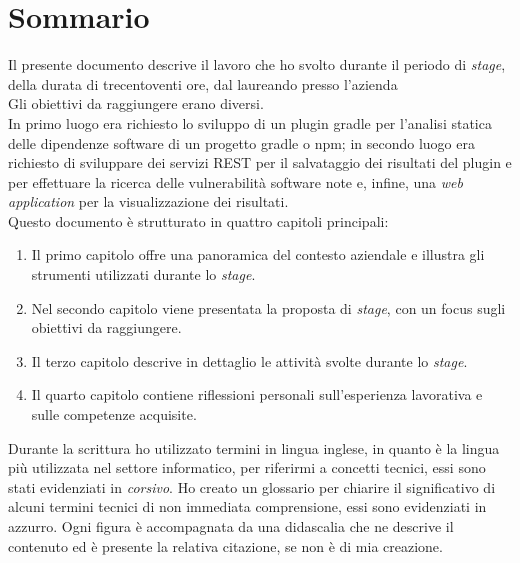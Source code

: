 \cleardoublepage
{}
{}
\begingroup
\let\clearpage\relax
\let\cleardoublepage\relax
\let\cleardoublepage\relax

\chapter*{Sommario}

Il presente documento descrive il lavoro che ho svolto durante il periodo di \textit{stage}, della durata di trecentoventi ore, dal laureando {\myName} presso l'azienda {\azienda} \\
Gli obiettivi da raggiungere erano diversi.\\
In primo luogo era richiesto lo sviluppo di un plugin gradle per l'analisi statica delle dipendenze software di un progetto gradle o npm;
in secondo luogo era richiesto di sviluppare dei servizi REST per il salvataggio dei risultati del plugin e per effettuare la ricerca
delle vulnerabilità software note e, infine,
una \textit{web application} per la visualizzazione dei risultati.\\
Questo documento è strutturato in quattro capitoli principali:
\begin{enumerate}
    \item Il primo capitolo offre una panoramica del contesto aziendale e illustra gli strumenti utilizzati durante lo \textit{stage}.
    \item Nel secondo capitolo viene presentata la proposta di \textit{stage}, con un focus sugli obiettivi da raggiungere.
    \item Il terzo capitolo descrive in dettaglio le attività svolte durante lo \textit{stage}.
    \item Il quarto capitolo contiene riflessioni personali sull'esperienza lavorativa e sulle competenze acquisite.
\end{enumerate}

\noindent Durante la scrittura ho utilizzato termini in lingua inglese, in quanto è la lingua più utilizzata nel settore informatico, per riferirmi a concetti tecnici, essi sono stati evidenziati in \textit{corsivo}.
Ho creato un glossario per chiarire il significativo di alcuni termini tecnici di non immediata comprensione, essi sono evidenziati in azzurro.
Ogni figura è accompagnata da una didascalia che ne descrive il contenuto ed è presente la relativa citazione, se non è di mia creazione.





\endgroup

\vfill
